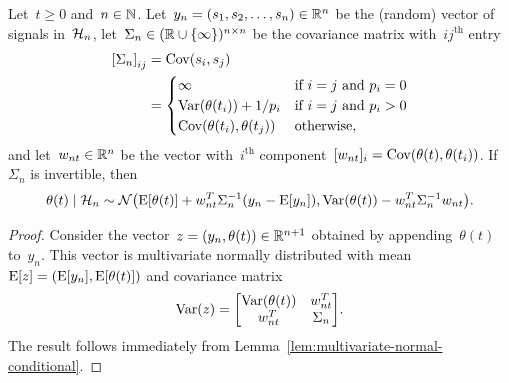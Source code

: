 \documentclass[11pt,oneside]{article}
\begin{document}
\begin{lemma}
    \label{lem:posterior}
    Let~$t\ge0$ and~$n\in\mathbb{N}$.
    Let~$y_n=(s_1,s_2,\ldots,s_n)\in\mathbb{R}^n$ be the (random) vector of signals in~$\mathcal{H}_n$, let~$\Sigma_n\in(\mathbb{R}\cup\{\infty\})^{n\times n}$ be the covariance matrix with~${ij}^\text{th}$ entry
    \begin{align*}
        \left[\Sigma_n\right]_{ij}
        &= \Cov(s_i,s_j) \\
        &= \begin{cases}
            \infty & \text{if}\ i=j\ \text{and}\ p_i=0 \\
            \Var(\theta(t_i))+1/p_i & \text{if}\ i=j\ \text{and}\ p_i>0 \\
            \Cov(\theta(t_i),\theta(t_j)) & \text{otherwise},
        \end{cases}
    \end{align*}
    and let~$w_{nt}\in\mathbb{R}^n$ be the vector with~$i^\text{th}$ component~$[w_{nt}]_i=\operatorname{Cov}(\theta(t),\theta(t_i))$.
    If~$\Sigma_n$ is invertible, then
    \[ \theta(t)\mid\Hcal_n\sim\Ncal\left(\E[\theta(t)]+w_{nt}^T\Sigma_n^{-1}\left(y_n-\E[y_n]\right),\Var(\theta(t))-w_{nt}^T\Sigma_n^{-1}w_{nt}\right). \]
\end{lemma}
%
\begin{proof}
    Consider the vector~$z=(y_n,\theta(t))\in\mathbb{R}^{n+1}$ obtained by appending~$\theta(t)$ to~$y_n$.
    This vector is multivariate normally distributed with mean~$\operatorname{E}[z]=(\operatorname{E}[y_n],\operatorname{E}[\theta(t)])$ and covariance matrix
    \[ \Var(z)=\begin{bmatrix}
        \Var(\theta(t)) & w_{nt}^T \\
        w_{nt}^T & \Sigma_n
    \end{bmatrix}. \]
    The result follows immediately from Lemma~\ref{lem:multivariate-normal-conditional}.
\end{proof}
\end{document}
